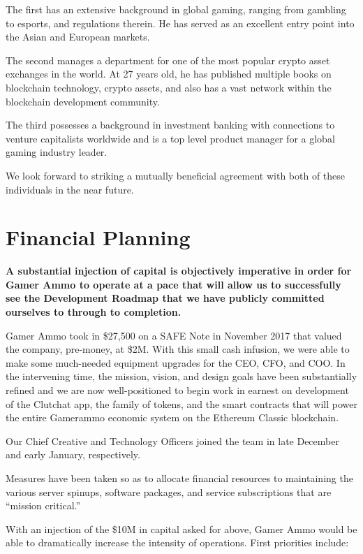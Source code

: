 \documentclass[11pt]{report}
\begin{document}
The first has an extensive background in global gaming, ranging from gambling to esports, and regulations therein. He has served as an excellent entry point into the Asian and European markets.

The second manages a department for one of the most popular crypto asset exchanges in the world. At 27 years old, he has published multiple books on blockchain technology, crypto assets, and also has a vast network within the blockchain development community.

The third possesses a background in investment banking with connections to venture capitalists worldwide and is a top level product manager for a global gaming industry leader.

We look forward to striking a mutually beneficial agreement with both of these individuals in the near future.
\chapter{Financial Planning}
{\textbf{A substantial injection of capital is objectively imperative in order for Gamer Ammo to operate at a pace that will allow us to successfully see the Development Roadmap that we have publicly committed ourselves to through to completion.}}

Gamer Ammo took in \$27,500 on a SAFE Note\cite{safe-note} in November 2017 that valued the company, pre-money, at \$2M. With this small cash infusion, we were able to make some much-needed equipment upgrades for the CEO, CFO, and COO. In the intervening time, the mission, vision, and design goals have been substantially refined and we are now well-positioned to begin work in earnest on development of the Clutchat app, the family of tokens, and the smart contracts that will power the entire Gamerammo economic system on the Ethereum Classic blockchain.

Our Chief Creative and Technology Officers joined the team in late December and early January, respectively.

Measures have been taken so as to allocate financial resources to maintaining the various server spinups, software packages, and service subscriptions that are ``mission critical.''

With an injection of the \$10M in capital asked for above, Gamer Ammo would be able to dramatically increase the intensity of operations. First priorities include:
\end{document}
